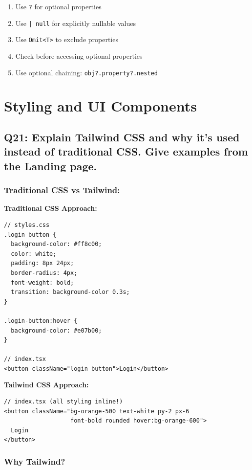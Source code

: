 \documentclass[12pt]{article}
\begin{document}
\begin{enumerate}
    \item Use \texttt{?} for optional properties
    \item Use \texttt{| null} for explicitly nullable values
    \item Use \texttt{Omit<T>} to exclude properties
    \item Check before accessing optional properties
    \item Use optional chaining: \texttt{obj?.property?.nested}
\end{enumerate}

\section{Styling and UI Components}

\subsection{Q21: Explain Tailwind CSS and why it's used instead of traditional CSS. Give examples from the Landing page.}

\subsubsection*{Traditional CSS vs Tailwind:}

\textbf{Traditional CSS Approach:}

\begin{lstlisting}
// styles.css
.login-button {
  background-color: #ff8c00;
  color: white;
  padding: 8px 24px;
  border-radius: 4px;
  font-weight: bold;
  transition: background-color 0.3s;
}

.login-button:hover {
  background-color: #e07b00;
}

// index.tsx
<button className="login-button">Login</button>
\end{lstlisting}

\textbf{Tailwind CSS Approach:}

\begin{lstlisting}
// index.tsx (all styling inline!)
<button className="bg-orange-500 text-white py-2 px-6 
                   font-bold rounded hover:bg-orange-600">
  Login
</button>
\end{lstlisting}

\subsubsection*{Why Tailwind?}
\end{document}
